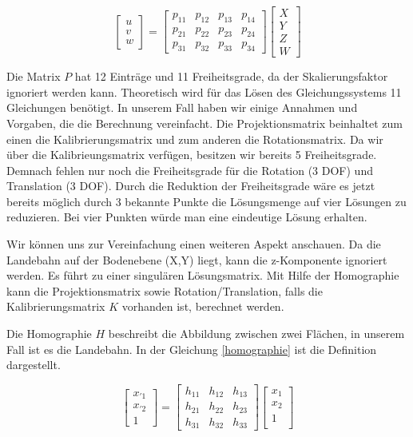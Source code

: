 \documentclass{ezb}
\begin{document}
\begin{equation} \label{projectionmatrix}
\begin{bmatrix}
u \\
v \\
w 
\end{bmatrix}
=
\begin{bmatrix}
p_{11} & p_{12} & p_{13} & p_{14} \\
p_{21} & p_{22} & p_{23} & p_{24} \\
p_{31} & p_{32} & p_{33} & p_{34} 
\end{bmatrix}
\begin{bmatrix}
X \\
Y \\
Z \\
W
\end{bmatrix}
\end{equation}  

Die Matrix $P$ hat 12 Einträge und 11 Freiheitsgrade, da der Skalierungsfaktor ignoriert werden kann. Theoretisch wird für das Lösen des Gleichungssystems 11 Gleichungen benötigt. In unserem Fall haben wir einige Annahmen und Vorgaben, die die Berechnung vereinfacht. Die Projektionsmatrix beinhaltet zum einen die Kalibrierungsmatrix und zum anderen die Rotationsmatrix. Da wir über die Kalibrieungsmatrix verfügen, besitzen wir bereits 5 Freiheitsgrade. Demnach fehlen nur noch die Freiheitsgrade für die Rotation (3 DOF) und Translation (3 DOF). Durch die Reduktion der Freiheitsgrade wäre es jetzt bereits möglich durch 3 bekannte Punkte die Lösungsmenge auf vier Lösungen zu reduzieren. Bei vier Punkten würde man eine eindeutige Lösung erhalten.

Wir können uns zur Vereinfachung einen weiteren Aspekt anschauen. Da die Landebahn auf der Bodenebene (X,Y) liegt, kann die z-Komponente ignoriert werden. Es führt zu einer singulären Lösungsmatrix. Mit Hilfe der Homographie kann die Projektionsmatrix sowie Rotation/Translation, falls die Kalibrierungsmatrix $K$ vorhanden ist, berechnet werden.

Die Homographie $H$ beschreibt die Abbildung zwischen zwei Flächen, in unserem Fall ist es die Landebahn. In der Gleichung \ref{homographie} ist die Definition dargestellt.

\begin{equation} \label{homographie}
\begin{bmatrix}
x_{'1} \\
x_{'2} \\
1 
\end{bmatrix}
=
\begin{bmatrix}
h_{11} & h_{12} & h_{13} \\
h_{21} & h_{22} & h_{23} \\
h_{31} & h_{32} & h_{33} 
\end{bmatrix}
\begin{bmatrix}
x_{1} \\
x_{2} \\
1 \\
\end{bmatrix}
\end{equation} 
\end{document}

